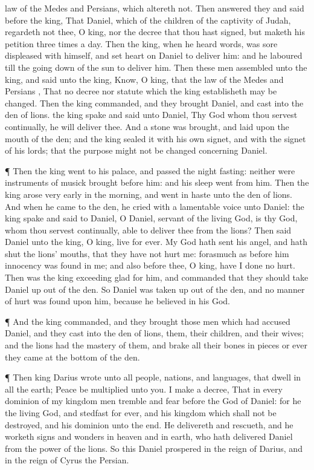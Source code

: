 {law of the
Medes and
Persians, which
altereth
not.
Then
answered they and
said
before the
king, That
Daniel, which
{}
of the
children of the
captivity of
Judah,
regardeth
not
thee, O
king, nor the
decree that thou hast
signed, but
maketh his
petition
three
times a
day.
Then the
king, when he
heard
{}
words, was
sore
displeased with himself, and
set
{}
heart
on
Daniel to
deliver him: and he
laboured
till the going
down of the
sun to
deliver him.
Then
these
men
assembled
unto the
king, and
said unto the
king,
Know, O
king, that the
law of the
Medes and
Persians
{}, That
no
decree nor
statute which the
king
establisheth may be
changed.
Then the
king
commanded, and they
brought
Daniel, and
cast
{} into the
den of
lions.
{} the
king
spake and
said unto
Daniel, Thy
God whom
thou
servest
continually, he will
deliver thee.
And
a
stone was
brought, and
laid
upon the
mouth of the
den; and the
king
sealed it with his own
signet, and with the
signet of his
lords; that the
purpose might
not be
changed concerning
Daniel.
\par }{\PP {}¶
Then the
king
went to his
palace, and passed the
night
fasting:
neither were
instruments of musick
brought
before him: and his
sleep
went from
him.
Then the
king
arose very
early in the
morning, and
went in
haste unto the
den of
lions.
And when he
came to the
den, he
cried with a
lamentable
voice unto
Daniel:
{} the
king
spake and
said to
Daniel, O
Daniel,
servant of the
living
God, is thy
God, whom thou
servest
continually,
able to
deliver thee
from the
lions?
Then
said
Daniel
unto the
king, O
king,
live for
ever.
My
God hath
sent his
angel, and hath
shut the
lions’
mouths, that they have
not
hurt me: forasmuch
as
before him
innocency was
found in me; and
also
before thee, O
king, have I
done
no
hurt.
Then was the
king
exceeding
glad for
him, and
commanded that they should
take
Daniel
up out
of the
den. So
Daniel was taken
up out
of the
den, and
no
manner of
hurt was
found upon him, because he
believed in his
God.
\par }{\PP {}¶ And the
king
commanded, and they
brought
those
men which had
accused
Daniel, and they
cast
{} into the
den of
lions,
them, their
children, and their
wives; and the
lions had the
mastery of them, and
brake
all their
bones in
pieces or
ever they
came at the
bottom of the
den.
\par }{\PP {}¶
Then
king
Darius
wrote unto
all
people,
nations, and
languages, that
dwell in
all the
earth;
Peace be
multiplied unto you.
I
make a
decree, That in
every
dominion of my
kingdom men
tremble and
fear
before the
God of
Daniel: for he
{} the
living
God, and
stedfast for
ever, and his
kingdom
{} which shall
not be
destroyed, and his
dominion
{}
unto the
end.
He
delivereth and
rescueth, and he
worketh
signs and
wonders in
heaven and in
earth, who hath
delivered
Daniel
from the
power of the
lions.
So
this
Daniel
prospered in the
reign of
Darius, and in the
reign of
Cyrus the
Persian.

}
